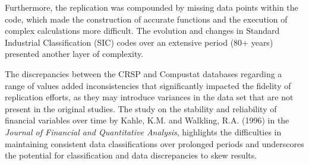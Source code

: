 \documentclass{article}
\begin{document}
Furthermore, the replication was compounded by missing data points within the code, which made the construction of accurate functions and the execution of complex calculations more difficult. The evolution and changes in Standard Industrial Classification (SIC) codes over an extensive period (80+ years) presented another layer of complexity. 

The discrepancies between the CRSP and Compustat databases regarding a range of values added inconsistencies that significantly impacted the fidelity of replication efforts, as they may introduce variances in the data set that are not present in the original studies. The study on the stability and reliability of financial variables over time by Kahle, K.M. and Walkling, R.A. (1996) in the \textit{Journal of Financial and Quantitative Analysis}, highlights the difficulties in maintaining consistent data classifications over prolonged periods and underscores the potential for classification and data discrepancies to skew results.
\end{document}
